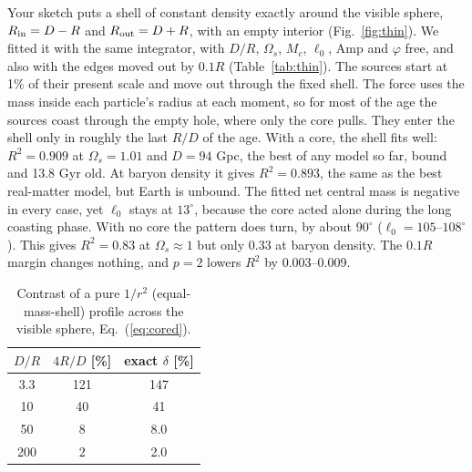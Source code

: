 \documentclass[10pt,letterpaper]{article}
\begin{document}
Your sketch puts a shell of constant density exactly around the visible sphere, $R_{\rm in}=D-R$ and $R_{\rm out}=D+R$, with an empty interior (Fig.~\ref{fig:thin}). We fitted it with the same integrator, with $D/R$, $\Omega_s$, $M_c$, $\ell_0$, Amp and $\varphi$ free, and also with the edges moved out by $0.1R$ (Table~\ref{tab:thin}). The sources start at 1\% of their present scale and move out through the fixed shell. The force uses the mass inside each particle's radius at each moment, so for most of the age the sources coast through the empty hole, where only the core pulls. They enter the shell only in roughly the last $R/D$ of the age. With a core, the shell fits well: $R^2=0.909$ at $\Omega_s=1.01$ and $D=94$ Gpc, the best of any model so far, bound and 13.8 Gyr old. At baryon density it gives $R^2=0.893$, the same as the best real-matter model, but Earth is unbound. The fitted net central mass is negative in every case, yet $\ell_0$ stays at $13^\circ$, because the core acted alone during the long coasting phase. With no core the pattern does turn, by about $90^\circ$ ($\ell_0=105$--$108^\circ$). This gives $R^2=0.83$ at $\Omega_s\approx1$ but only 0.33 at baryon density. The $0.1R$ margin changes nothing, and $p=2$ lowers $R^2$ by 0.003--0.009.

\begin{table}[H]\centering\small
\caption{Contrast of a pure $1/r^2$ (equal-mass-shell) profile across the visible sphere, Eq.~(\ref{eq:cored}).}\label{tab:cored}
\begin{tabular}{ccc}\toprule
$D/R$ & $4R/D$ [\%] & exact $\delta$ [\%]\\\midrule
3.3 & 121 & 147\\ 10 & 40 & 41\\ 50 & 8 & 8.0\\ 200 & 2 & 2.0\\\bottomrule
\end{tabular}\end{table}
\end{document}
